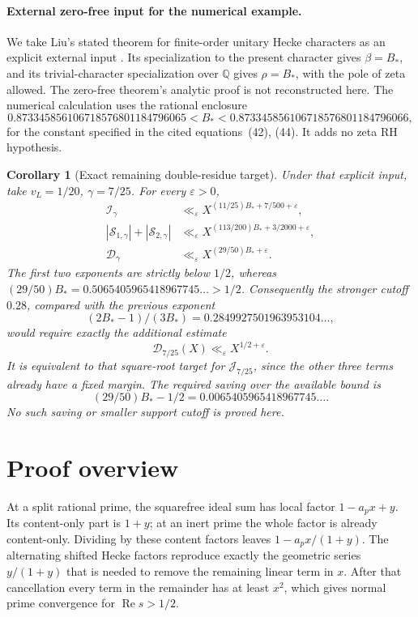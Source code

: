 \documentclass[11pt]{article}
\newcommand{\mathscr}{\mathcal}
\numberwithin{equation}{section}
\newcommand{\Rea}{\operatorname{Re}}
\newtheorem{corollary}[theorem]{Corollary}
\begin{document}
\paragraph{External zero-free input for the numerical example.}
We take Liu's stated theorem for finite-order unitary Hecke
characters as an explicit external input
\cite[Theorem~1.2, p.~3; Theorem~8.29, pp.~78--80]{AMLiu}.
Its specialization to the present character gives \(\beta=B_*\),
and its trivial-character specialization over \(\mathbb Q\)
gives \(\rho=B_*\), with the pole of zeta allowed.
The zero-free theorem's analytic proof is not reconstructed here.
The numerical calculation uses the rational enclosure
\[
 0.873345856106718576801184796065<B_*<
 0.873345856106718576801184796066,
\]
for the constant specified in the cited equations~(42), (44).
It adds no zeta RH hypothesis.

\begin{corollary}[Exact remaining double-residue target]\label{res:numerical-main}
Under that explicit input, take \(v_L=1/20\), \(\gamma=7/25\).
For every \(\varepsilon>0\),
\begin{align*}
 \mathscr I_\gamma&\ll_\varepsilon
 X^{(11/25)B_*+7/500+\varepsilon},\\
 |\mathscr S_{1,\gamma}|+|\mathscr S_{2,\gamma}|
 &\ll_\varepsilon X^{(113/200)B_*+3/2000+\varepsilon},\\
 \mathscr D_\gamma&\ll_\varepsilon X^{(29/50)B_*+\varepsilon}.
\end{align*}
The first two exponents are strictly below \(1/2\), whereas
\((29/50)B_*=0.5065405965418967745\ldots>1/2\).
Consequently the stronger cutoff \(0.28\), compared with
the previous exponent
\[ (2B_*-1)/(3B_*)=0.2849927501963953104\ldots, \]
would require
exactly the additional estimate
\[
 \mathscr D_{7/25}(X)\ll_\varepsilon X^{1/2+\varepsilon}.
\]
It is equivalent to that square-root target for
\(\mathscr J_{7/25}\), since the other three terms already have
a fixed margin. The required saving over the available bound is
\[ (29/50)B_*-1/2=0.0065405965418967745\ldots. \]
No such saving or smaller support cutoff is proved here.
\end{corollary}


\section{Proof overview}

At a split rational prime, the squarefree ideal sum has local
factor $1-a_px+y$. Its content-only part is $1+y$; at an inert
prime the whole factor is already content-only. Dividing by these
content factors leaves $1-a_px/(1+y)$. The alternating shifted
Hecke factors reproduce exactly the geometric series
$y/(1+y)$ that is needed to remove the remaining linear term in
$x$. After that cancellation every term in the remainder has
at least $x^2$, which gives normal prime convergence for
$\Rea s>1/2$.
\end{document}
